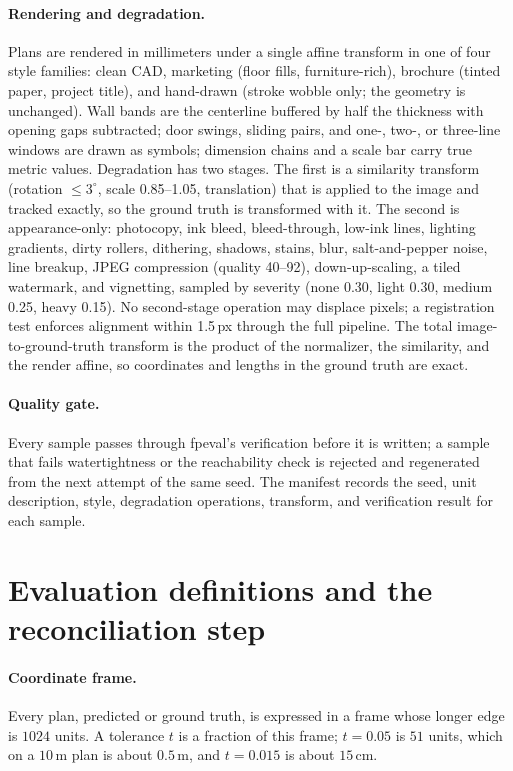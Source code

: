 \documentclass{article}
\begin{document}
\paragraph{Rendering and degradation.}
Plans are rendered in millimeters under a single affine transform in one of
four style families: clean CAD, marketing (floor fills, furniture-rich),
brochure (tinted paper, project title), and hand-drawn (stroke wobble only; the
geometry is unchanged). Wall bands are the centerline buffered by half the
thickness with opening gaps subtracted; door swings, sliding pairs, and one-,
two-, or three-line windows are drawn as symbols; dimension chains and a scale
bar carry true metric values. Degradation has two stages. The first is a
similarity transform (rotation $\le3^\circ$, scale 0.85--1.05, translation)
that is applied to the image and tracked exactly, so the ground truth is
transformed with it. The second is appearance-only: photocopy, ink bleed,
bleed-through, low-ink lines, lighting gradients, dirty rollers, dithering,
shadows, stains, blur, salt-and-pepper noise, line breakup, JPEG compression
(quality 40--92), down-up-scaling, a tiled watermark, and vignetting, sampled by
severity (none 0.30, light 0.30, medium 0.25, heavy 0.15). No second-stage
operation may displace pixels; a registration test enforces alignment within
1.5\,px through the full pipeline. The total image-to-ground-truth transform is
the product of the normalizer, the similarity, and the render affine, so
coordinates and lengths in the ground truth are exact.

\paragraph{Quality gate.}
Every sample passes through fpeval's verification before it is written; a
sample that fails watertightness or the reachability check is rejected and
regenerated from the next attempt of the same seed. The manifest records the
seed, unit description, style, degradation operations, transform, and
verification result for each sample.

\section{Evaluation definitions and the reconciliation step}\label{app:fpeval}
\paragraph{Coordinate frame.} Every plan, predicted or ground truth, is
expressed in a frame whose longer edge is $1024$ units. A tolerance $t$ is a
fraction of this frame; $t=0.05$ is $51$ units, which on a $10$\,m plan is
about $0.5$\,m, and $t=0.015$ is about $15$\,cm.
\end{document}
